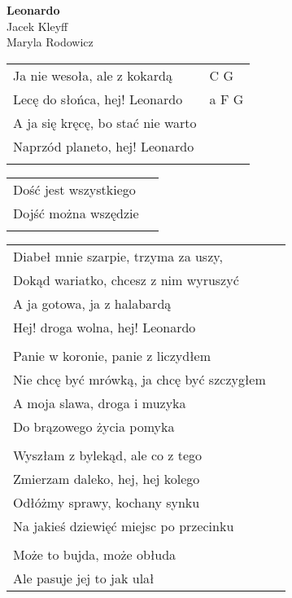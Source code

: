 \documentclass[a5paper]{article}
\begin{document}


\noindent
\fontsize{12pt}{15pt}\selectfont
\textbf{Leonardo} \\
\fontsize{8pt}{10pt}\selectfont
Jacek Kleyff \\ Maryla Rodowicz \\
\fontsize{10pt}{12pt}\selectfont
{}
\begin{tabular}{@{}p{7.50cm}p{3cm}@{}}
\noindent
Ja nie wesoła, ale z kokardą & C G \\
Lecę do słońca, hej! Leonardo & a F G \\
A ja się kręcę, bo stać nie warto \\
Naprzód planeto, hej! Leonardo \\ \\
\end{tabular}

\noindent
\begin{tabular}{@{}p{4.00cm}p{3cm}@{}}
Dość jest wszystkiego \\
Dojść można wszędzie  \\ \\
\end{tabular}

\noindent
\begin{tabular}{@{}p{6.50cm}p{3cm}@{}}
Diabeł mnie szarpie, trzyma za uszy,  \\
Dokąd wariatko, chcesz z nim wyruszyć \\
A ja gotowa, ja z halabardą \\
Hej! droga wolna, hej! Leonardo \\ \\

Panie w koronie, panie z liczydłem\\
Nie chcę być mrówką, ja chcę być szczygłem\\
A moja slawa, droga i muzyka\\
Do brązowego życia pomyka \\ \\

Wyszłam z bylekąd, ale co z tego \\
Zmierzam daleko, hej, hej kolego\\
Odłóżmy sprawy, kochany synku\\
Na jakieś dziewięć miejsc po przecinku\\ \\

Może to bujda, może obłuda\\
Ale pasuje jej to jak ulał
\end{tabular}
\end{document}
